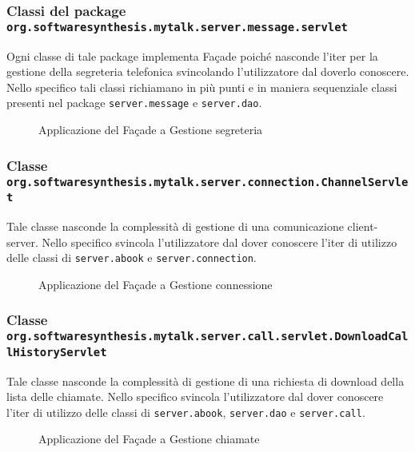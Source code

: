 \subsubsection*{Classi del package \texttt{org.softwaresynthesis.mytalk.server.message.servlet}}

Ogni classe di tale package implementa Façade poiché nasconde l'iter per la gestione della segreteria telefonica svincolando l'utilizzatore dal doverlo conoscere. Nello specifico tali classi richiamano in più punti e in maniera sequenziale classi presenti nel package \texttt{server.message} e \texttt{server.dao}.

\begin{figure}[H]
  \centering
  \caption{Applicazione del  Façade a \textsf{Gestione segreteria}}\label{fig:facadeaddressbook2}
\end{figure}

\subsubsection*{Classe \texttt{org.softwaresynthesis.mytalk.server.connection.ChannelServlet}}

Tale classe nasconde la complessità di gestione di una comunicazione client-server. Nello specifico svincola l'utilizzatore dal dover conoscere l'iter di utilizzo delle classi di \texttt{server.abook} e \texttt{server.connection}.

\begin{figure}[H]
  \centering
  \caption{Applicazione del  Façade a \textsf{Gestione connessione}}\label{fig:facadeconnection}
\end{figure}

\subsubsection*{Classe \texttt{org.softwaresynthesis.mytalk.server.call.servlet.DownloadCallHistoryServlet}}

Tale classe nasconde la complessità di gestione di una richiesta di download della lista delle chiamate. Nello specifico svincola l'utilizzatore dal dover conoscere l'iter di utilizzo delle classi di \texttt{server.abook}, \texttt{server.dao} e \texttt{server.call}.

\begin{figure}[H]
  \centering
  \caption{Applicazione del  Façade a \textsf{Gestione chiamate}}\label{fig:facadestate}
\end{figure}

